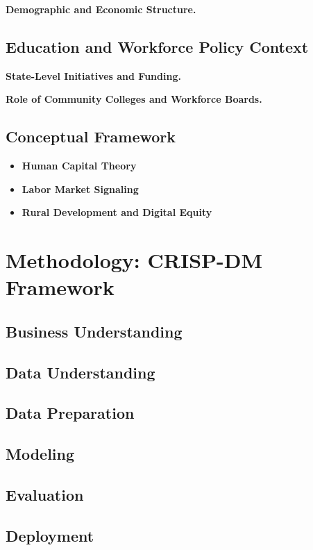 \documentclass[12pt]{article}
\begin{document}
\textbf{Demographic and Economic Structure.} 
\subsection{Education and Workforce Policy Context}
\textbf{State-Level Initiatives and Funding.} 

\textbf{Role of Community Colleges and Workforce Boards.} 

\subsection{Conceptual Framework}
\begin{itemize}
  \item \textbf{Human Capital Theory}
  \item \textbf{Labor Market Signaling}
  \item \textbf{Rural Development and Digital Equity}
\end{itemize}

\section{Methodology: CRISP-DM Framework}
\subsection{Business Understanding}

\subsection{Data Understanding}

\subsection{Data Preparation}

\subsection{Modeling}

\subsection{Evaluation}

\subsection{Deployment}
\end{document}

